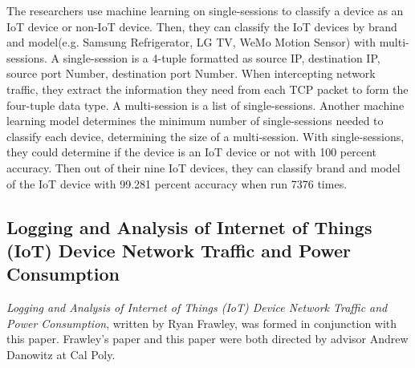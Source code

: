 The researchers use machine learning on single-sessions to classify a device as an IoT device or non-IoT device. Then, they can classify the IoT devices by brand and model(e.g. Samsung Refrigerator, LG TV, WeMo Motion Sensor) with multi-sessions. A single-session is a 4-tuple formatted as source IP, destination IP, source port Number, destination port Number. When intercepting network traffic, they extract the information they need from each TCP packet to form the four-tuple data type. A multi-session is a list of single-sessions. Another machine learning model determines the minimum number of single-sessions needed to classify each device, determining the size of a multi-session. With single-sessions, they could determine if the device is an IoT device or not with 100 percent accuracy. Then out of their nine IoT devices, they can classify brand and model of the IoT device with 99.281 percent accuracy when run 7376 times.


\subsection{Logging and Analysis of Internet of Things (IoT) Device Network Traffic and Power Consumption}
\label{frawleyPaper}
\textit{Logging and Analysis of Internet of Things (IoT) Device Network Traffic and Power Consumption}\cite{frawley_2018}, written by Ryan Frawley, was formed in conjunction with this paper. Frawley's paper and this paper were both directed by advisor Andrew Danowitz at Cal Poly.

